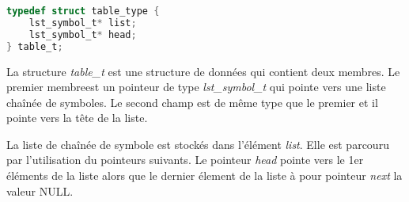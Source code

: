 \lstset{style=mystyle}
\begin{lstlisting}[language=C, caption=Structure d'une table de symbole]
typedef struct table_type {
    lst_symbol_t* list;
    lst_symbol_t* head;
} table_t;
\end{lstlisting}

La structure \textit{table\_t} est une structure de données qui contient deux membres. Le premier membreest un pointeur de type \textit{lst\_symbol\_t} qui pointe vers une liste chaînée de symboles. Le second champ est de même type que le premier et il pointe vers la tête de la liste.

La liste de chaînée de symbole est stockés dans l'élément \textit{list}. Elle est parcouru par l'utilisation du pointeurs suivants. 
Le pointeur \textit{head} pointe vers le 1er éléments de la liste alors que le dernier élement de la liste à pour pointeur \textit{next} la valeur NULL.
\newpage